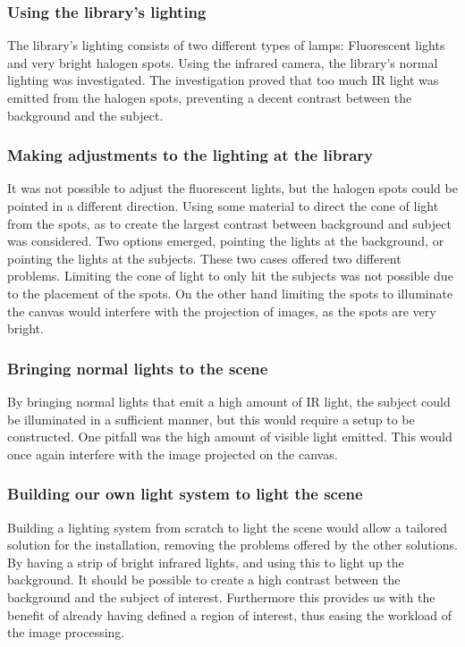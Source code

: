 \subsubsection{Using the library's lighting}
The library's lighting consists of two different types of lamps: Fluorescent lights and very bright halogen spots. Using the infrared camera, the library's normal lighting was investigated. The investigation proved that too much IR light was emitted from the halogen spots, preventing a decent contrast between the background and the subject.

\subsubsection{Making adjustments to the lighting at the library}
It was not possible to adjust the fluorescent lights, but the halogen spots could be pointed in a different direction. Using some material to direct the cone of light from the spots, as to create the largest contrast between background and subject was considered. Two options emerged, pointing the lights at the background, or pointing the lights at the subjects. These two cases offered two different problems. Limiting the cone of light to only hit the subjects was not possible due to the placement of the spots. On the other hand limiting the spots to illuminate the canvas would interfere with the projection of images, as the spots are very bright.

\subsubsection{Bringing normal lights to the scene} 
By bringing normal lights that emit a high amount of IR light, the subject could be illuminated in a sufficient manner, but this would require a setup to be constructed. One pitfall was the high amount of visible light emitted. This would once again interfere with the image projected on the canvas.

\subsubsection{Building our own light system to light the scene}
Building a lighting system from scratch to light the scene would allow a tailored solution for the installation, removing the problems offered by the other solutions. By having a strip of bright infrared lights, and using this to light up the background. It should be possible to create a high contrast between the background and the subject of interest. Furthermore this provides us with the benefit of already having defined a region of interest, thus easing the workload of the image processing.

